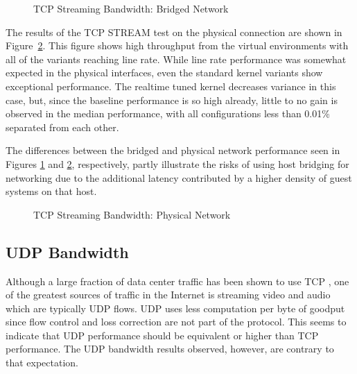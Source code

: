 \begin{figure}
    \centering
    \def\svgwidth{\columnwidth}
    
    \caption{TCP Streaming Bandwidth: Bridged Network}
    \label{fig:tcp_stream_bridge}
\end{figure}

The results of the TCP STREAM test on the physical connection are shown in Figure~\ref{fig:tcp_stream_phys}.
This figure shows high throughput from the virtual environments with all of the variants reaching line rate.
While line rate performance was somewhat expected in the physical interfaces, even the standard kernel variants show exceptional performance.
The realtime tuned kernel decreases variance in this case, but, since the baseline performance is so high already, little to no gain is observed in the median performance, with all configurations less than 0.01\% separated from each other.  

The differences between the bridged and physical network performance seen in Figures \ref{fig:tcp_stream_bridge} and \ref{fig:tcp_stream_phys}, respectively, partly illustrate the risks of using host bridging for networking due to the additional latency contributed by a higher density of guest systems on that host.  

\begin{figure}
    \centering
    \def\svgwidth{\columnwidth}
    
    \caption{TCP Streaming Bandwidth: Physical Network}
    \label{fig:tcp_stream_phys}
\end{figure}

\subsection{UDP Bandwidth} %
\label{sub:udpbandwidth}
Although a large fraction of data center traffic has been shown to use TCP \autocite{haTCPCloud2013}, one of the greatest sources of traffic in the Internet is streaming video and audio which are typically UDP flows.
UDP uses less computation per byte of goodput since flow control and loss correction are not part of the protocol.  
This seems to indicate that UDP performance should be equivalent or higher than TCP performance.  
The UDP bandwidth results observed, however, are contrary to that expectation.

